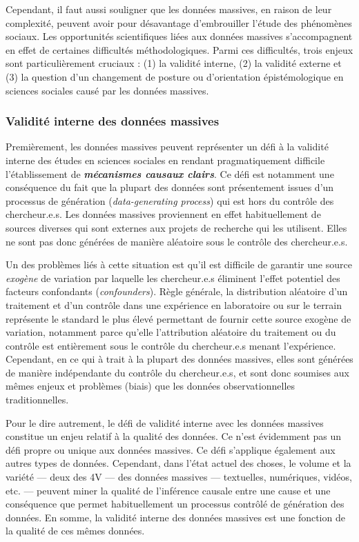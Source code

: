 \documentclass[
  letterpaper,
  DIV=11,
  numbers=noendperiod]{scrreprt}
\begin{document}
Cependant, il faut aussi souligner que les données massives, en raison
de leur complexité, peuvent avoir pour désavantage d'embrouiller l'étude
des phénomènes sociaux. Les opportunités scientifiques liées aux données
massives s'accompagnent en effet de certaines difficultés
méthodologiques. Parmi ces difficultés, trois enjeux sont
particulièrement cruciaux : (1) la validité interne, (2) la validité
externe et (3) la question d'un changement de posture ou d'orientation
épistémologique en sciences sociales causé par les données massives.

\hypertarget{validituxe9-interne-des-donnuxe9es-massives}{%
\subsubsection*{Validité interne des données
massives}\label{validituxe9-interne-des-donnuxe9es-massives}}

Premièrement, les données massives peuvent représenter un défi à la
validité interne des études en sciences sociales en rendant
pragmatiquement difficile l'établissement de \textbf{\emph{mécanismes
causaux clairs}}. Ce défi est notamment une conséquence du fait que la
plupart des données sont présentement issues d'un processus de
génération (\emph{data-generating process}) qui est hors du contrôle des
chercheur.e.s. Les données massives proviennent en effet habituellement
de sources diverses qui sont externes aux projets de recherche qui les
utilisent. Elles ne sont pas donc générées de manière aléatoire sous le
contrôle des chercheur.e.s.

Un des problèmes liés à cette situation est qu'il est difficile de
garantir une source \emph{exogène} de variation par laquelle les
chercheur.e.s éliminent l'effet potentiel des facteurs confondants
(\emph{confounders}). Règle générale, la distribution aléatoire d'un
traitement et d'un contrôle dans une expérience en laboratoire ou sur le
terrain représente le standard le plus élevé permettant de fournir cette
source exogène de variation, notamment parce qu'elle l'attribution
aléatoire du traitement ou du contrôle est entièrement sous le contrôle
du chercheur.e.s menant l'expérience. Cependant, en ce qui à trait à la
plupart des données massives, elles sont générées de manière
indépendante du contrôle du chercheur.e.s, et sont donc soumises aux
mêmes enjeux et problèmes (biais) que les données observationnelles
traditionnelles.

Pour le dire autrement, le défi de validité interne avec les données
massives constitue un enjeu relatif à la qualité des données. Ce n'est
évidemment pas un défi propre ou unique aux données massives. Ce défi
s'applique également aux autres types de données. Cependant, dans l'état
actuel des choses, le volume et la variété --- deux des 4V --- des
données massives --- textuelles, numériques, vidéos, etc. --- peuvent
miner la qualité de l'inférence causale entre une cause et une
conséquence que permet habituellement un processus contrôlé de
génération des données. En somme, la validité interne des données
massives est une fonction de la qualité de ces mêmes données.
\end{document}
